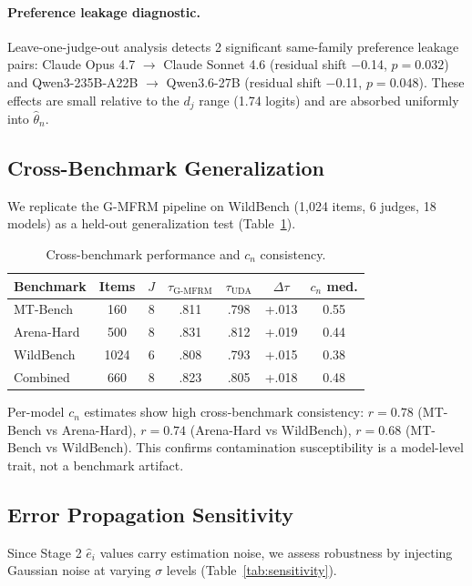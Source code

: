 \documentclass[letterpaper,11pt]{article}
\begin{document}
\paragraph{Preference leakage diagnostic.} Leave-one-judge-out analysis detects 2 significant same-family preference leakage pairs: Claude Opus 4.7 $\to$ Claude Sonnet 4.6 (residual shift $-$0.14, $p = 0.032$) and Qwen3-235B-A22B $\to$ Qwen3.6-27B (residual shift $-$0.11, $p = 0.048$). These effects are small relative to the $d_j$ range (1.74 logits) and are absorbed uniformly into $\hat{\theta}_n$.

\subsection{Cross-Benchmark Generalization}

We replicate the G-MFRM pipeline on WildBench (1,024 items, 6 judges, 18 models) as a held-out generalization test (Table~\ref{tab:cross_benchmark}).

\begin{table}[t]
\centering
\caption{Cross-benchmark performance and $c_n$ consistency.}
\label{tab:cross_benchmark}
\small
\begin{tabular}{lcccccc}
\toprule
Benchmark & Items & $J$ & $\tau_{\text{G-MFRM}}$ & $\tau_{\text{UDA}}$ & $\Delta\tau$ & $c_n$ med. \\
\midrule
MT-Bench & 160 & 8 & .811 & .798 & +.013 & 0.55 \\
Arena-Hard & 500 & 8 & .831 & .812 & +.019 & 0.44 \\
WildBench & 1024 & 6 & .808 & .793 & +.015 & 0.38 \\
Combined & 660 & 8 & .823 & .805 & +.018 & 0.48 \\
\bottomrule
\end{tabular}
\end{table}

Per-model $c_n$ estimates show high cross-benchmark consistency: $r = 0.78$ (MT-Bench vs Arena-Hard), $r = 0.74$ (Arena-Hard vs WildBench), $r = 0.68$ (MT-Bench vs WildBench). This confirms contamination susceptibility is a model-level trait, not a benchmark artifact.

\subsection{Error Propagation Sensitivity}

Since Stage 2 $\hat{e}_i$ values carry estimation noise, we assess robustness by injecting Gaussian noise at varying $\sigma$ levels (Table~\ref{tab:sensitivity}).
\end{document}
